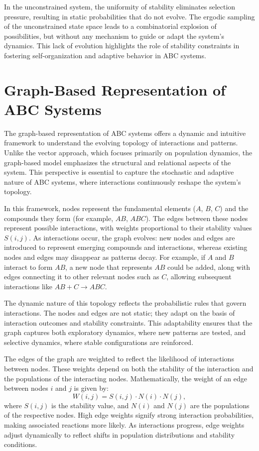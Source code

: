 \documentclass[%
 preprint, linenumbers,
 amsmath,amssymb,
 aps, physrev,
]{revtex4-2}
\begin{document}
In the unconstrained system, the uniformity of stability eliminates selection pressure, resulting in static probabilities that do not evolve. The ergodic sampling of the unconstrained state space leads to a combinatorial explosion of possibilities, but without any mechanism to guide or adapt the system's dynamics. This lack of evolution highlights the role of stability constraints in fostering self-organization and adaptive behavior in ABC systems.


\section{Graph-Based Representation of ABC Systems}

The graph-based representation of ABC systems offers a dynamic and intuitive framework to understand the evolving topology of interactions and patterns. Unlike the vector approach, which focuses primarily on population dynamics, the graph-based model emphasizes the structural and relational aspects of the system. This perspective is essential to capture the stochastic and adaptive nature of ABC systems, where interactions continuously reshape the system's topology.

In this framework, nodes represent the fundamental elements ($A$, $B$, $C$) and the compounds they form (for example, $AB$, $ABC$). The edges between these nodes represent possible interactions, with weights proportional to their stability values $S(i, j)$. As interactions occur, the graph evolves: new nodes and edges are introduced to represent emerging compounds and interactions, whereas existing nodes and edges may disappear as patterns decay. For example, if $A$ and $B$ interact to form $AB$, a new node that represents $AB$ could be added, along with edges connecting it to other relevant nodes such as $C$, allowing subsequent interactions like $AB + C \to ABC$.

The dynamic nature of this topology reflects the probabilistic rules that govern interactions. The nodes and edges are not static; they adapt on the basis of interaction outcomes and stability constraints. This adaptability ensures that the graph captures both exploratory dynamics, where new patterns are tested, and selective dynamics, where stable configurations are reinforced.

The edges of the graph are weighted to reflect the likelihood of interactions between nodes. These weights depend on both the stability of the interaction and the populations of the interacting nodes. Mathematically, the weight of an edge between nodes $i$ and $j$ is given by:
\begin{equation}
W(i, j) = S(i, j) \cdot N(i) \cdot N(j),
\end{equation}
where $S(i, j)$ is the stability value, and $N(i)$ and $N(j)$ are the populations of the respective nodes. High edge weights signify strong interaction probabilities, making associated reactions more likely. As interactions progress, edge weights adjust dynamically to reflect shifts in population distributions and stability conditions.
\end{document}
